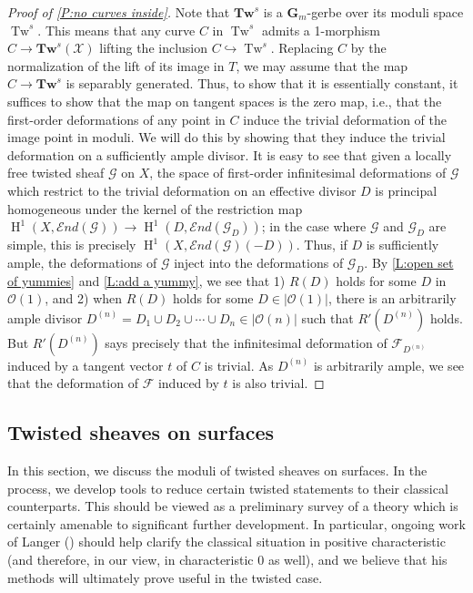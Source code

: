 \documentclass[11pt]{amsart}
\newcommand{\field}[1]{\mathbf #1}
\newcommand{\ms}[1]{\mathscr #1}
\newcommand{\send}{\ms E\!nd}
\newcommand{\G}{\field G} %
\renewcommand{\H}{\operatorname{H}}
\renewcommand{\[}{[\!\hspace{0.03em}[}
\renewcommand{\]}{]\!\hspace{0.03em}]}
\renewcommand{\(}{(\!\hspace{0.03em}(}
\renewcommand{\)}{)\!\hspace{0.03em})}
\newcommand{\inj}{\hookrightarrow}
\newcommand{\Tw}{\mathbf{Tw}}
\DeclareMathOperator{\mTw}{Tw}
\theoremstyle{definition}
\theoremstyle{remark}
\begin{document}
\begin{proof}[Proof of \ref{P:no curves inside}]   
Note that $\Tw^{s}$ is a $\G_{m}$-gerbe over its moduli 
space $\mTw^{s}$.  This means that any curve $C$ in $\mTw^s$ admits a 1-morphism 
$C\to\Tw^{s}(\ms X)$ lifting the inclusion $C\inj \mTw^s$.  Replacing $C$ 
by the normalization of the lift of its image in $T$, we may assume 
that the map $C\to\Tw^{s}$ is separably generated.  Thus, to show that 
it is essentially constant, it suffices to show that the map on 
tangent spaces is the zero map, i.e., that the first-order 
deformations of any point in $C$ induce the trivial deformation of 
the image point in moduli.  We will do this by showing that they 
induce the trivial deformation on a sufficiently ample divisor.  
It is easy to see that given a locally 
free twisted sheaf $\ms G$ on $X$, the space of first-order infinitesimal deformations of $\ms G$ 
which restrict to the trivial deformation on an effective divisor $D$ 
is principal homogeneous under the kernel of the restriction map 
$\H^{1}(X,\send(\ms G))\to\H^{1}(D,\send(\ms G_{D}))$; in the case 
where $\ms G$ and $\ms G_{D}$ are simple, this is precisely 
$\H^{1}(X,\send(\ms G)(-D))$.  Thus, if $D$ is sufficiently ample, 
the deformations of $\ms G$ inject into the deformations of $\ms G_{D}$.  By \ref{L:open set of yummies} and 
\ref{L:add a yummy}, we see that 1) $R(D)$ holds for some $D$ in 
${\ms O}(1)$, and 2) when $R(D)$ holds for some 
$D\in|{\ms O}(1)|$, there is an arbitrarily ample 
divisor $D^{(n)}=D_{1}\cup D_{2}\cup\cdots\cup D_{n}\in|{\ms O}(n)|$ such that 
$R'(D^{(n)})$ holds.  But $R'(D^{(n)})$ says precisely that the 
infinitesimal deformation of $\ms F_{D^{(n)}}$ induced by a 
tangent vector $t$ of $C$ is trivial.  As $D^{(n)}$ is arbitrarily ample, 
we see that the deformation of $\ms F$ induced by $t$ is also trivial.
\end{proof}

\subsection{Twisted sheaves on surfaces}
In this section, we discuss the moduli of twisted sheaves on surfaces.  In the 
process, we develop tools to reduce certain twisted statements to 
their classical counterparts.  This should be viewed as a preliminary survey of a 
theory which is certainly amenable to significant further 
development.  In particular, ongoing work of Langer 
(\cite{langer-castelnuovo}) should help 
clarify the classical situation in positive characteristic (and therefore, in 
our view, in characteristic 0 as well), and we believe that his methods 
will ultimately prove useful in the twisted case.
\end{document}
